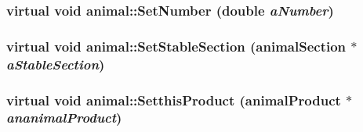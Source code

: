 \label{classanimal_a80c4d74b88eb18cb48c4abe1a327d8ce}
\hypertarget{classanimal_abe026348f883bc244e1d8e473b173c81}{
\subsubsection[{SetNumber}]{\setlength{\rightskip}{0pt plus 5cm}virtual void animal::SetNumber (double {\em aNumber})}}
\label{classanimal_abe026348f883bc244e1d8e473b173c81}
\hypertarget{classanimal_a258dbe20d150fc63fd99a08c28484a2c}{
\subsubsection[{SetStableSection}]{\setlength{\rightskip}{0pt plus 5cm}virtual void animal::SetStableSection ({\bf animalSection} $\ast$ {\em aStableSection})}}
\label{classanimal_a258dbe20d150fc63fd99a08c28484a2c}
\hypertarget{classanimal_a1c0454fe63d9eb95b59178f0a1700f1f}{
\subsubsection[{SetthisProduct}]{\setlength{\rightskip}{0pt plus 5cm}virtual void animal::SetthisProduct ({\bf animalProduct} $\ast$ {\em ananimalProduct})}}
\label{classanimal_a1c0454fe63d9eb95b59178f0a1700f1f}


